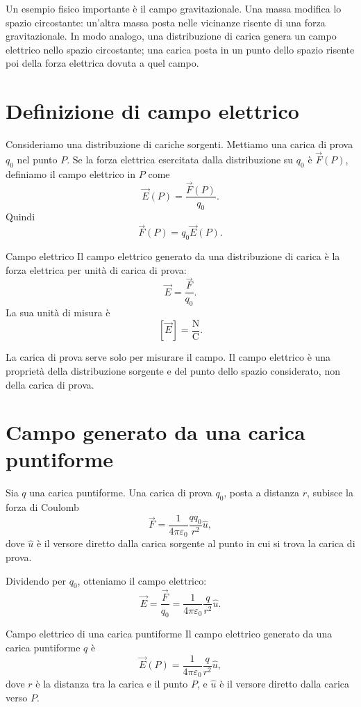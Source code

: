 \documentclass[a4paper]{article}
\begin{document}
Un esempio fisico importante è il campo gravitazionale. Una massa modifica lo spazio circostante: un'altra massa posta nelle vicinanze risente di una forza gravitazionale. In modo analogo, una distribuzione di carica genera un campo elettrico nello spazio circostante; una carica posta in un punto dello spazio risente poi della forza elettrica dovuta a quel campo.

\section{Definizione di campo elettrico}

Consideriamo una distribuzione di cariche sorgenti. Mettiamo una carica di prova \(q_0\) nel punto \(P\). Se la forza elettrica esercitata dalla distribuzione su \(q_0\) è \(\vec{F}(P)\), definiamo il campo elettrico in \(P\) come
\[
    \vec{E}(P)=\frac{\vec{F}(P)}{q_0}.
\]
Quindi
\[
    \vec{F}(P)=q_0\vec{E}(P).
\]

\begin{snippetdefinition}{Campo elettrico}
    Il campo elettrico generato da una distribuzione di carica è la forza elettrica per unità di carica di prova:
    \[
        \vec{E}=\frac{\vec{F}}{q_0}.
    \]
    La sua unità di misura è
    \[
        [\vec{E}]=\frac{\mathrm{N}}{\mathrm{C}}.
    \]
\end{snippetdefinition}

La carica di prova serve solo per misurare il campo. Il campo elettrico è una proprietà della distribuzione sorgente e del punto dello spazio considerato, non della carica di prova.

\section{Campo generato da una carica puntiforme}

Sia \(q\) una carica puntiforme. Una carica di prova \(q_0\), posta a distanza \(r\), subisce la forza di Coulomb
\[
    \vec{F}=\frac{1}{4\pi\varepsilon_0}\frac{qq_0}{r^2}\hat{u},
\]
dove \(\hat{u}\) è il versore diretto dalla carica sorgente al punto in cui si trova la carica di prova.

Dividendo per \(q_0\), otteniamo il campo elettrico:
\[
    \vec{E}=\frac{\vec{F}}{q_0}
    =\frac{1}{4\pi\varepsilon_0}\frac{q}{r^2}\hat{u}.
\]

\begin{snippettheorem}{Campo elettrico di una carica puntiforme}
    Il campo elettrico generato da una carica puntiforme \(q\) è
    \[
        \vec{E}(P)=\frac{1}{4\pi\varepsilon_0}\frac{q}{r^2}\hat{u},
    \]
    dove \(r\) è la distanza tra la carica e il punto \(P\), e \(\hat{u}\) è il versore diretto dalla carica verso \(P\).
\end{snippettheorem}
\end{document}
